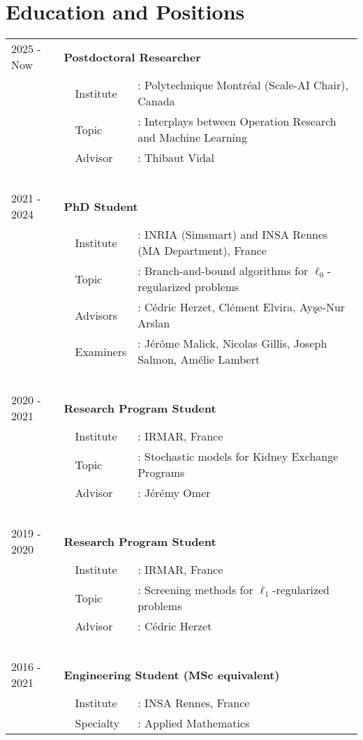 \section{Education and Positions}

\begin{longtable}[l]{@{}p{}p{}p{}p{}}
    2025 - Now & \multicolumn{3}{l}{\textbf{Postdoctoral Researcher}} \\
    & & Institute &: Polytechnique Montréal (Scale-AI Chair), Canada \\
    & & Topic &: Interplays between Operation Research and Machine Learning \\
    & & Advisor &: Thibaut Vidal \\~\\
    2021 - 2024 & \multicolumn{3}{l}{\textbf{PhD Student}} \\
    & & Institute &: INRIA (Simsmart) and INSA Rennes (MA Department), France \\
    & & Topic &: Branch-and-bound algorithms for $\ell_0$-regularized problems \\
    & & Advisors &: Cédric Herzet, Clément Elvira, Ay\c{s}e-Nur Arslan \\
    & & Examiners &:  Jérôme Malick, Nicolas Gillis, Joseph Salmon, Amélie Lambert \\~\\
    2020 - 2021 & \multicolumn{3}{l}{\textbf{Research Program Student}} \\
    & & Institute &: IRMAR, France \\
    & & Topic &: Stochastic models for Kidney Exchange Programs \\
    & & Advisor &: Jérémy Omer \\~\\
    2019 - 2020 & \multicolumn{3}{l}{\textbf{Research 
    Program Student}} \\
    & & Institute &: IRMAR, France \\
    & & Topic &: Screening methods for $\ell_1$-regularized problems \\
    & & Advisor &: Cédric Herzet \\~\\
    2016 - 2021 & \multicolumn{3}{l}{\textbf{Engineering Student (MSc equivalent)}} \\
    & & Institute &: INSA Rennes, France \\
    & & Specialty &: Applied Mathematics
\end{longtable}
